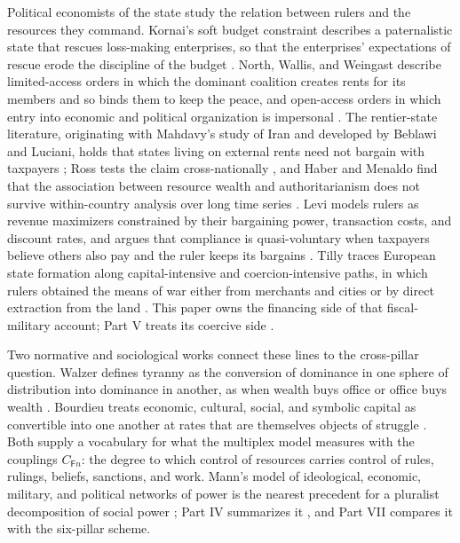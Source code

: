 \documentclass[11pt,letterpaper]{article}
\theoremstyle{definition}
\theoremstyle{remark}
\newcommand{\pF}{\mathsf{F}}
\begin{document}
Political economists of the state study the relation between rulers and the resources they command. Kornai's soft budget constraint describes a paternalistic state that rescues loss-making enterprises, so that the enterprises' expectations of rescue erode the discipline of the budget \citep{kornai1986,kornai1992}. North, Wallis, and Weingast describe limited-access orders in which the dominant coalition creates rents for its members and so binds them to keep the peace, and open-access orders in which entry into economic and political organization is impersonal \citep{nww2009}. The rentier-state literature, originating with Mahdavy's study of Iran and developed by Beblawi and Luciani, holds that states living on external rents need not bargain with taxpayers \citep{mahdavy1970,beblawiluciani1987}; Ross tests the claim cross-nationally \citep{ross2001,ross2012}, and Haber and Menaldo find that the association between resource wealth and authoritarianism does not survive within-country analysis over long time series \citep{habermenaldo2011}. Levi models rulers as revenue maximizers constrained by their bargaining power, transaction costs, and discount rates, and argues that compliance is quasi-voluntary when taxpayers believe others also pay and the ruler keeps its bargains \citep{levi1988}. Tilly traces European state formation along capital-intensive and coercion-intensive paths, in which rulers obtained the means of war either from merchants and cities or by direct extraction from the land \citep{tilly1990}. This paper owns the financing side of that fiscal-military account; Part V treats its coercive side \citep{long2026coercive}.

Two normative and sociological works connect these lines to the cross-pillar question. Walzer defines tyranny as the conversion of dominance in one sphere of distribution into dominance in another, as when wealth buys office or office buys wealth \citep{walzer1983}. Bourdieu treats economic, cultural, social, and symbolic capital as convertible into one another at rates that are themselves objects of struggle \citep{bourdieu1989}. Both supply a vocabulary for what the multiplex model measures with the couplings $C_{\pF n}$: the degree to which control of resources carries control of rules, rulings, beliefs, sanctions, and work. Mann's model of ideological, economic, military, and political networks of power is the nearest precedent for a pluralist decomposition of social power \citep{mann1986}; Part IV summarizes it \citep[Section 4.2]{long2026ideological}, and Part VII compares it with the six-pillar scheme.
\end{document}
